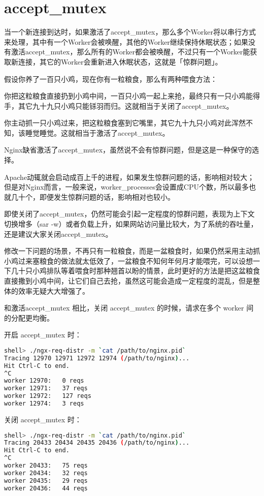 \chapter{accept\_mutex}

当一个新连接到达时，如果激活了accept\_mutex，那么多个Worker将以串行方式来处理，其中有一个Worker会被唤醒，其他的Worker继续保持休眠状态；如果没有激活accept\_mutex，那么所有的Worker都会被唤醒，不过只有一个Worker能获取新连接，其它的Worker会重新进入休眠状态，这就是「惊群问题」。

假设你养了一百只小鸡，现在你有一粒粮食，那么有两种喂食方法：

\begin{compactitem}
\item 你把这粒粮食直接扔到小鸡中间，一百只小鸡一起上来抢，最终只有一只小鸡能得手，其它九十九只小鸡只能铩羽而归。这就相当于关闭了accept\_mutex。
\item 你主动抓一只小鸡过来，把这粒粮食塞到它嘴里，其它九十九只小鸡对此浑然不知，该睡觉睡觉。这就相当于激活了accept\_mutex。
\end{compactitem}

Nginx缺省激活了accept\_mutex，虽然说不会有惊群问题，但是这是一种保守的选择。

Apache动辄就会启动成百上千的进程，如果发生惊群问题的话，影响相对较大；但是对Nginx而言，一般来说，worker\_processes会设置成CPU个数，所以最多也就几十个，即便发生惊群问题的话，影响相对也较小。

即使关闭了accept\_mutex，仍然可能会引起一定程度的惊群问题，表现为上下文切换增多（sar -w）或者负载上升，如果网站访问量比较大，为了系统的吞吐量，还是建议大家关闭accept\_mutex。

修改一下问题的场景，不再只有一粒粮食，而是一盆粮食时，如果仍然采用主动抓小鸡过来塞粮食的做法就太低效了，一盆粮食不知何年何月才能喂完，可以设想一下几十只小鸡排队等着喂食时那种翘首以盼的情景，此时更好的方法是把这盆粮食直接撒到小鸡中间，让它们自己去抢，虽然这可能会造成一定程度的混乱，但是整体的效率无疑大大增强了。



和激活accept\_mutex 相比，关闭 accept\_mutex 的时候，请求在多个 worker 间的分配更均衡。

\begin{compactitem}
\item 开启 accept\_mutex 时：

\begin{lstlisting}[language=bash]
shell> ./ngx-req-distr -m `cat /path/to/nginx.pid`
Tracing 12970 12971 12972 12974 (/path/to/nginx)...
Hit Ctrl-C to end.
^C
worker 12970:	0 reqs
worker 12971:	37 reqs
worker 12972:	127 reqs
worker 12974:	3 reqs
\end{lstlisting}

\item 关闭 accept\_mutex 时：

\begin{lstlisting}[language=bash]
shell> ./ngx-req-distr -m `cat /path/to/nginx.pid`
Tracing 20433 20434 20435 20436 (/path/to/nginx)...
Hit Ctrl-C to end.
^C
worker 20433:	75 reqs
worker 20434:	32 reqs
worker 20435:	29 reqs
worker 20436:	44 reqs
\end{lstlisting}

\end{compactitem}

